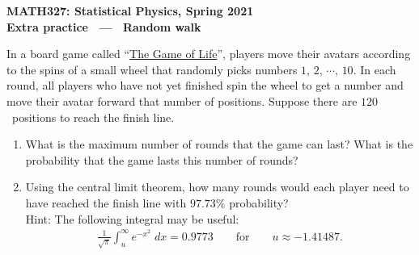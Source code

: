 \documentclass[12 pt]{article} %
\begin{document}
\newcommand{\thisweek}{MATH327 Extra (Walk)}
\newcommand{\moddate}{Last modified 29 Mar.~2021}
\begin{center}
  {\Large \textbf{MATH327: Statistical Physics, Spring 2021}} \\[12 pt]
  {\Large \textbf{Extra practice \ --- \ Random walk}} \\[24 pt]
\end{center}

In a board game called ``\href{https://en.wikipedia.org/wiki/The_Game_of_Life}{The Game of Life}'', players move their avatars according to the spins of a small wheel that randomly picks numbers $1$, $2$, $\cdots$, $10$.
In each round, all players who have not yet finished spin the wheel to get a number and move their avatar forward that number of positions.
Suppose there are $120$~positions to reach the finish line.

\begin{enumerate}[label={(\alph*)}]
  \item What is the maximum number of rounds that the game can last?
        What is the probability that the game lasts this number of rounds?
  \item Using the central limit theorem, how many rounds would each player need to have reached the finish line with $97.73\%$ probability? \\[12 pt]
        Hint: The following integral may be useful:
        \begin{align*}
          \frac{1}{\sqrt{\pi}} \int_u^{\infty} e^{-x^2} \; dx = 0.9773 \qquad \mbox{for} \qquad u \approx -1.41487.
        \end{align*}
\end{enumerate}
\end{document}
